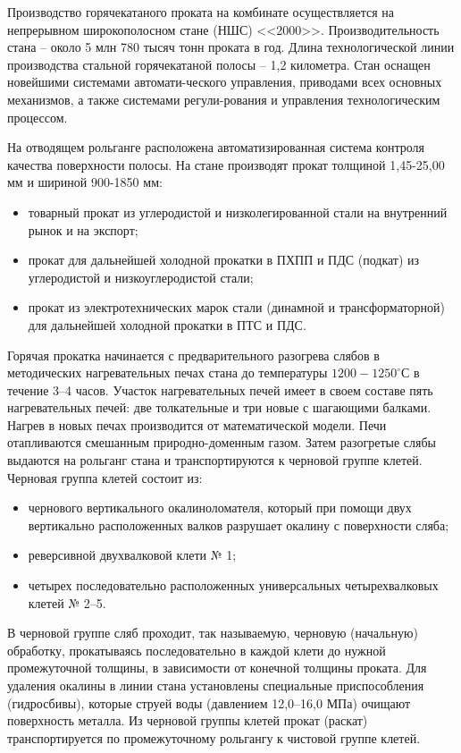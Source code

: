 Производство горячекатаного проката на комбинате осуществляется на непрерывном широкополосном стане (НШС) <<2000>>. Производительность стана – около 5 млн 780 тысяч тонн проката в год. Длина технологической линии производства стальной горячекатаной полосы – 1,2 километра. Стан оснащен новейшими системами автомати-ческого управления, приводами всех основных механизмов, а также системами регули-рования и управления технологическим процессом.

На отводящем рольганге расположена автоматизированная система контроля качества поверхности полосы. На стане производят прокат толщиной 1,45-25,00 мм и шириной 900-1850 мм:

\begin{itemize}
\item товарный прокат из углеродистой и низколегированной стали на внутренний рынок и на экспорт;
\item прокат для дальнейшей холодной прокатки в ПХПП и ПДС (подкат) из углеродистой и низкоуглеродистой стали;
\item прокат из электротехнических марок стали (динамной и трансформаторной) для дальнейшей холодной прокатки в ПТС и ПДС.
\end{itemize}

Горячая прокатка начинается с предварительного разогрева слябов в методических нагревательных печах стана до температуры $1200-1250^\circ$С в течение 3–4 часов. Участок нагревательных печей имеет в своем составе пять нагревательных печей: две толкательные и три новые с шагающими балками. Нагрев в новых печах производится от математической модели. Печи отапливаются смешанным природно-доменным газом. Затем разогретые слябы выдаются на рольганг стана и транспортируются к черновой группе клетей. Черновая группа клетей состоит из:

\begin{itemize}
\item чернового вертикального окалиноломателя, который при помощи двух вертикально расположенных валков разрушает окалину с поверхности сляба;
\item реверсивной двухвалковой клети № 1;
\item четырех последовательно расположенных универсальных четырехвалковых клетей № 2–5.
\end{itemize}

В черновой группе сляб проходит, так называемую, черновую (начальную) обработку, прокатываясь последовательно в каждой клети до нужной промежуточной толщины, в зависимости от конечной толщины проката. Для удаления окалины в линии стана установлены специальные приспособления (гидросбивы), которые струей воды (давлением 12,0–16,0 МПа) очищают поверхность металла. Из черновой группы клетей прокат (раскат) транспортируется по промежуточному рольгангу к чистовой группе клетей.

